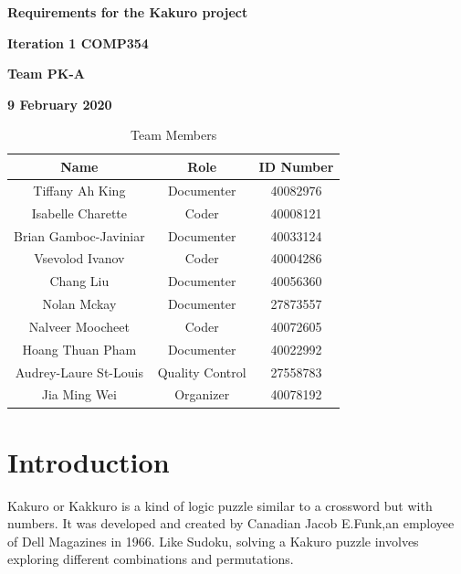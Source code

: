 \documentclass[12pt]{article}
\begin{document}
\vspace*{0.5in}
\centerline{\bf\Large
Requirements for the Kakuro project}

\vspace*{0.5in}
\centerline{\bf\Large Iteration 1 COMP354}

\vspace*{0.5in}
\centerline{\bf\Large Team PK-A}

\vspace*{0.5in}
\centerline{\bf\Large 9 February 2020}

\vspace*{1.5in}
\begin{table}[htbp]
\caption{Team Members}
\begin{center}
\begin{tabular}{|c |c | c|}
\hline
Name & Role & ID Number \\
\hline\hline
Tiffany Ah King & Documenter & 40082976 \\
\hline
Isabelle Charette & Coder & 40008121 \\
\hline
Brian Gamboc-Javiniar & Documenter & 40033124 \\
\hline
Vsevolod Ivanov & Coder & 40004286 \\
\hline
Chang Liu & Documenter & 40056360 \\
\hline
Nolan Mckay & Documenter & 27873557 \\
\hline
Nalveer Moocheet & Coder & 40072605 \\
\hline
Hoang Thuan Pham & Documenter & 40022992 \\
\hline
Audrey-Laure St-Louis & Quality Control & 27558783 \\
\hline
Jia Ming Wei & Organizer & 40078192 \\
\hline
\end{tabular}
\end{center}
\end{table}


\newpage



 \renewcommand*\contentsname{Table of Contents}

 

\tableofcontents


\newpage
\section{Introduction}


Kakuro or Kakkuro  is a kind of logic puzzle similar to a crossword but with numbers. It was developed and created by Canadian Jacob E.Funk,an employee of Dell Magazines in 1966. Like Sudoku, solving a Kakuro puzzle involves exploring different combinations and permutations.\\
\end{document}
